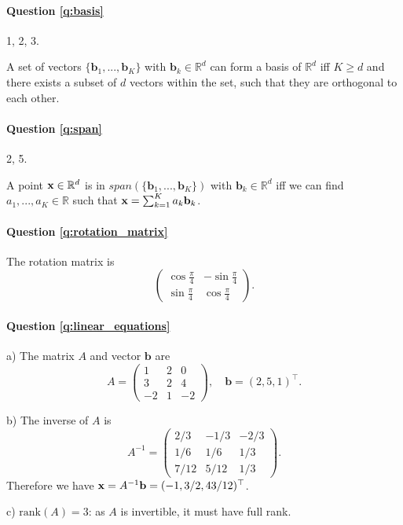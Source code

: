 \paragraph{Question \ref{q:basis}} 1, 2, 3. 

A set of vectors $\{\mathbf{b}_1, ..., \mathbf{b}_K \}$ with $\mathbf{b}_k \in \mathbb{R}^d$ can form a basis of $\mathbb{R}^d$ iff $K \geq d$ and there exists a subset of $d$ vectors within the set, such that they are orthogonal to each other.

\paragraph{Question \ref{q:span}} 2, 5. 

A point $\mathbf{x} \in \mathbb{R}^d$ is in $span(\{\mathbf{b}_1, ..., \mathbf{b}_K \})$ with $\mathbf{b}_k \in \mathbb{R}^d$ iff we can find $a_1, ..., a_K \in \mathbb{R}$ such that $\mathbf{x} = \sum_{k=1}^K a_k \mathbf{b}_k$.

\paragraph{Question \ref{q:rotation_matrix}} The rotation matrix is 
\begin{equation*}
    \begin{pmatrix}
    \cos{\frac{\pi}{4}} & -\sin{\frac{\pi}{4}} \\
    \sin{\frac{\pi}{4}} & \cos{\frac{\pi}{4}}
    \end{pmatrix}.
\end{equation*}

\paragraph{Question \ref{q:linear_equations}}

a) The matrix $A$ and vector $\mathbf{b}$ are
\begin{equation*}
A = \begin{pmatrix}
1 & 2 & 0 \\
3 & 2 & 4 \\
-2 & 1 & -2
\end{pmatrix}, \quad \mathbf{b} = (2, 5, 1)^\top.
\end{equation*}

b) The inverse of $A$ is 
\begin{equation*}
A^{-1} = \begin{pmatrix}
2/3 & -1/3 & -2/3 \\
1/6 & 1/6 & 1/3 \\
7/12 & 5/12 & 1/3
\end{pmatrix}.
\end{equation*}
Therefore we have $\mathbf{x} = A^{-1} \mathbf{b} = (-1, 3/2, 43/12)^\top$.

c) $\text{rank}(A) = 3$: as $A$ is invertible, it must have full rank.